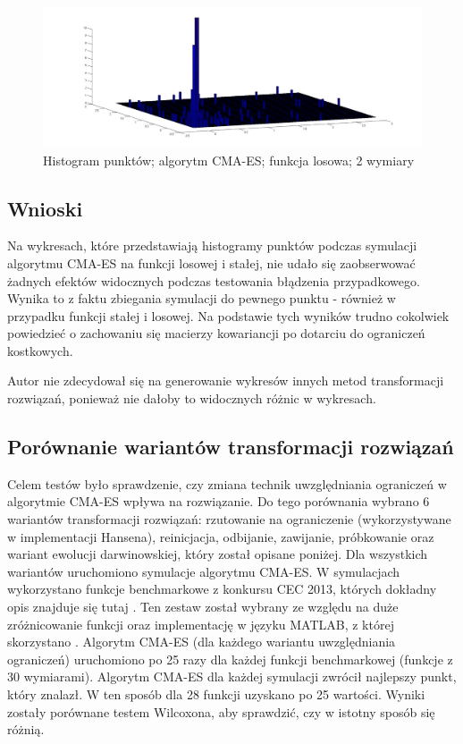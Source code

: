 \documentclass{mini}
\begin{document}
\begin{figure}[H]
\centering
\includegraphics[width=\textwidth]{cmaes-x2dim2-boundaries-v2}
\caption{Histogram punktów; algorytm CMA-ES; funkcja losowa; 2 wymiary}
\label{cmaes:x2}
\end{figure}

\subsection{Wnioski}
Na wykresach, które przedstawiają histogramy punktów podczas symulacji algorytmu CMA-ES na funkcji losowej i stałej, nie udało się zaobserwować żadnych efektów widocznych podczas testowania błądzenia przypadkowego. Wynika to z faktu zbiegania symulacji do pewnego punktu - również w przypadku funkcji stałej i losowej. Na podstawie tych wyników trudno cokolwiek powiedzieć o zachowaniu się macierzy kowariancji po dotarciu do ograniczeń kostkowych.

Autor nie zdecydował się na generowanie wykresów innych metod transformacji rozwiązań, ponieważ nie dałoby to widocznych różnic w wykresach.

\subsection{Porównanie wariantów transformacji rozwiązań}
Celem testów było sprawdzenie, czy zmiana technik uwzględniania ograniczeń w algorytmie CMA-ES wpływa na rozwiązanie. Do tego porównania wybrano 6 wariantów transformacji rozwiązań: rzutowanie na ograniczenie (wykorzystywane w implementacji Hansena), reinicjacja, odbijanie, zawijanie, próbkowanie oraz wariant ewolucji darwinowskiej, który został opisane poniżej. Dla wszystkich wariantów uruchomiono symulacje algorytmu CMA-ES. W symulacjach wykorzystano funkcje benchmarkowe z konkursu CEC 2013, których dokładny opis znajduje się tutaj \cite{cec}. Ten zestaw został wybrany ze względu na duże zróżnicowanie funkcji oraz implementację w języku MATLAB, z której skorzystano \cite{cec_code}. Algorytm CMA-ES (dla każdego wariantu uwzględniania ograniczeń) uruchomiono po 25 razy dla każdej funkcji benchmarkowej (funkcje z 30 wymiarami). Algorytm CMA-ES dla każdej symulacji zwrócił najlepszy punkt, który znalazł. W ten sposób dla 28 funkcji uzyskano po 25 wartości. Wyniki zostały porównane testem Wilcoxona, aby sprawdzić, czy w istotny sposób się różnią.
\end{document}
